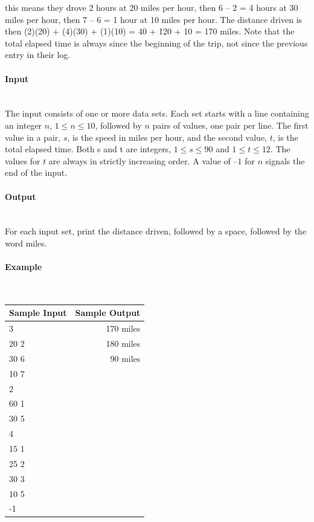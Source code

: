 \documentclass{article}
\begin{document}
this means they drove 2 hours at 20 miles per hour, then 6 – 2 = 4 hours at 30 miles per hour, then 7 – 6 = 1 hour at 10 miles per hour. The distance driven is then (2)(20) + (4)(30) + (1)(10) = 40 + 120 + 10 = 170 miles. Note that the total elapsed time is always since the beginning of the trip, not since the previous entry in their log.

\paragraph{Input} \mbox{} \\

The input consists of one or more data sets. Each set starts with a line containing an integer $n$, $1 \leq n \leq 10$, followed by $n$ pairs of values, one pair per line. The first value in a pair, $s$, is the speed in miles per hour, and the second value, $t$, is the total elapsed time. Both s and t are integers, $1 \leq s \leq 90$ and $1 \leq t \leq 12$. The values for $t$ are always in strictly increasing order. A value of $–1$ for $n$ signals the end of the input.

\paragraph{Output}\mbox{} \\

For each input set, print the distance driven, followed by a space, followed by the word miles.


\paragraph{Example}\mbox{} \\

\begin{table}[h]
    \centering
    \begin{tabular}{|l|r|}
        \hline
        \textbf{Sample Input} & \textbf{Sample Output} \\
        \hline
         3   & 170 miles  \\ 
         20 2   & 180 miles \\ 
        30 6  &  90 miles \\ 
     10 7   &  \\ 
       2     &  \\ 
         60 1   &  \\
        30 5     &  \\ 
        4      &  \\ 
        15 1       &  \\ 
        25 2        &  \\ 
         30 3   &  \\ 
        10 5        &  \\
        -1  &  \\ 
                  \hline
    \end{tabular}
\end{table}
\end{document}
